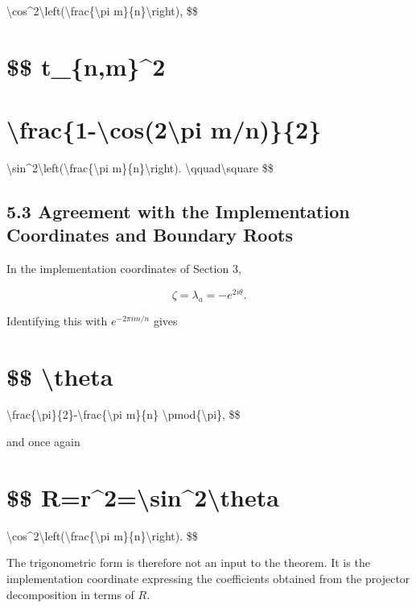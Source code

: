 \documentclass[
  a4paper,
  10pt]{article}
\begin{document}
\textbackslash cos\^{}2\textbackslash left(\textbackslash frac\{\textbackslash pi
m\}\{n\}\textbackslash right), \$\$

\section{\$\$ \textbar t\_\{n,m\}\textbar\^{}2}\label{-t_nm2}

\section{\textbackslash frac\{1-\textbackslash cos(2\textbackslash pi
m/n)\}\{2\}}\label{frac1-cos2pi-mn2}

\textbackslash sin\^{}2\textbackslash left(\textbackslash frac\{\textbackslash pi
m\}\{n\}\textbackslash right). \textbackslash qquad\textbackslash square
\$\$

\subsection{5.3 Agreement with the Implementation Coordinates and
Boundary
Roots}\label{53-agreement-with-the-implementation-coordinates-and-boundary-roots}

In the implementation coordinates of Section 3,

\[
\zeta=\lambda_a=-e^{2i\theta}.
\]

Identifying this with \(e^{-2\pi im/n}\) gives

\section{\$\$ \textbackslash theta}\label{-theta}

\textbackslash frac\{\textbackslash pi\}\{2\}-\textbackslash frac\{\textbackslash pi
m\}\{n\} \textbackslash pmod\{\textbackslash pi\}, \$\$

and once again

\section{\$\$
R=\textbar r\textbar\^{}2=\textbackslash sin\^{}2\textbackslash theta}\label{-rr2sin2theta}

\textbackslash cos\^{}2\textbackslash left(\textbackslash frac\{\textbackslash pi
m\}\{n\}\textbackslash right). \$\$

The trigonometric form is therefore not an input to the theorem. It is
the implementation coordinate expressing the coefficients obtained from
the projector decomposition in terms of \(R\).
\end{document}
